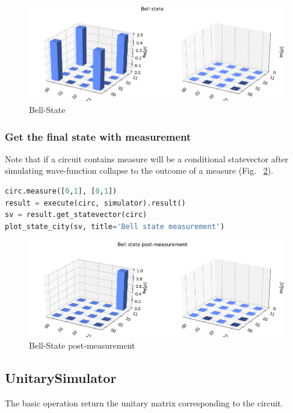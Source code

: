 \documentclass[a4paper,num-refs]{oup-contemporary}
\begin{document}
\begin{figure}[bt!] %
\centering
\includegraphics[width=\linewidth]{aer_provider_14_0.png}
\caption{Bell-State}\label{fig:bell-state}
\end{figure}

\subsubsection{Get the final state with measurement}

Note that if a circuit contains measure will be a conditional statevector after simulating wave-function collapse to the outcome of a measure (Fig. ~\ref{fig:bell-state-post-measurement}).

\begin{lstlisting}[language=Python]
circ.measure([0,1], [0,1])
result = execute(circ, simulator).result()
sv = result.get_statevector(circ)
plot_state_city(sv, title='Bell state measurement')
\end{lstlisting}

\begin{figure}[bt!] %
\centering
\includegraphics[width=\linewidth]{aer_provider_16_0.png}
\caption{Bell-State post-measurement}\label{fig:bell-state-post-measurement}
\end{figure}

\subsection{UnitarySimulator}
The basic operation return the unitary matrix corresponding to the circuit.
\end{document}
